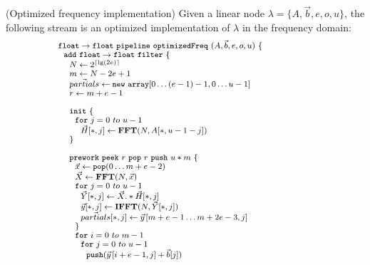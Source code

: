 \begin{transformation} (Optimized frequency implementation)
Given a linear node $\lambda = \{A, {\vec b}, e, o, u\}$, the
following stream is an optimized implementation of $\lambda$ in the
frequency domain: \\
\begin{equation} \nonumber
{\small
  \begin{array}{ll}

    {\tt float \rightarrow float}~{\tt pipeline~optimizedFreq~}(A, {\vec b}, e, o, u){\tt ~\{} & \hspace{40pt}\\
    ~~{\tt add~float \rightarrow float~filter~\{}\\
    ~~~~N \leftarrow 2^{\lceil \lg(2e) \rceil} \\
    ~~~~m \leftarrow N-2e+1 \\
    ~~~~\vec{partials} \leftarrow {\tt new~array}[0 \dots (e-1)-1, 0\dots u-1] \\
    ~~~~r \leftarrow m+e-1 \\
    \\
    ~~~~{\tt init}~{\tt \{} \\
    ~~~~~~{\tt for}~j=0~to~u-1\\
    ~~~~~~~~\vec{H}[*,j] \leftarrow \mathbf{FFT}(N,A[*,u-1-j]) \\
    ~~~~{\tt \}} \\
    \\
    ~~~~{\tt prework}~{\tt peek}~r~{\tt pop}~r~{\tt push}~u*m~{\tt \{}\\
    ~~~~~~\vec{x} \leftarrow {\tt pop}(0 \dots m+e-2) \\
    ~~~~~~\vec{X} \leftarrow \mathbf{FFT} (N, \vec{x}) \\
    ~~~~~~{\tt for}~j=0~to~u-1\\
    ~~~~~~~~\vec{Y}[*,j] \leftarrow \vec{X} .* \vec{H}[*,j] \\
    ~~~~~~~~\vec{y}[*,j] \leftarrow \mathbf{IFFT}(N, \vec{Y}[*,j]) \\
    ~~~~~~~~\vec{partials}[*,j] \leftarrow \vec{y}\hspace{1pt}[m+e-1 \dots m+2e-3,j] \\
    ~~~~~~{\tt \}} \\
    ~~~~~~{\tt for}~i=0~to~m-1\\
    ~~~~~~~~{\tt for}~j=0~to~u-1\\
    ~~~~~~~~~~{\tt push}(\vec{y}\hspace{1pt}[i+e-1,j] + \vec{b}[j]) \\

\end{array}}
\end{equation}
\end{transformation}
